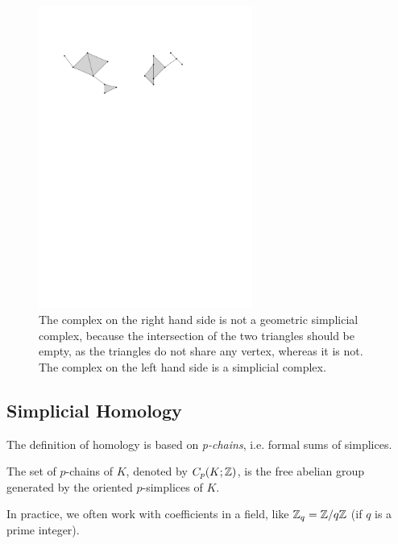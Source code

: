 \begin{figure}[h] \centering 
\includegraphics[width = 7cm]{figures/CounterExampleComplex} 
\caption[Geometric simplicial complex]{\label{fig:CEsimpl} The complex on the right hand side 
is not a geometric simplicial complex, because the intersection of the two 
triangles should be empty, as the triangles do not share any vertex, whereas it is not. 
The complex on the left hand side is a simplicial complex.} 
\end{figure}

\subsection{Simplicial Homology}
\label{sec:simplexHomo}

The definition of homology is based on {\em p-chains}, i.e. formal sums of simplices.

\begin{defin}
The set of $p$-chains of $K$, denoted by $C_{p}(K;\mathbb{Z})$, is the free 
abelian group generated by the oriented $p$-simplices of $K$.
\end{defin} 

In practice, we often work with coefficients in a field, like $\mathbb{Z}_q=\mathbb{Z}/q\mathbb{Z}$ (if $q$ is a prime integer). 


